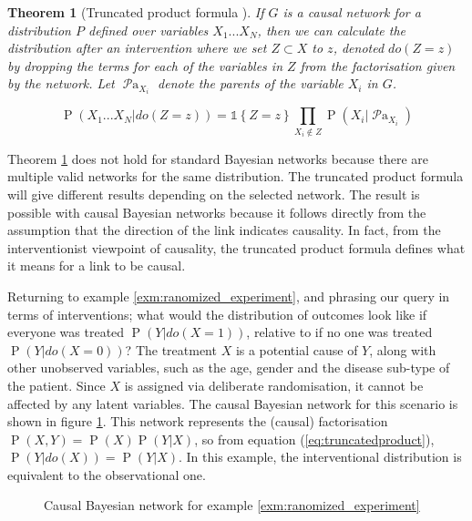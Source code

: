 \documentclass[11pt,a4paper,twoside]{report}
\newcommand{\set}[1]{\left\{#1\right\}}
\newcommand{\ind}[1]{\mathds{1}\!\!\set{#1}}
\renewcommand{\P}[1]{\operatorname{P}\left(#1\right)}
\newcommand{\parents}[1]{\operatorname{\mathcal{P}a}_{#1}}
\theoremstyle{plain}
\newtheorem{theorem}{Theorem}
\theoremstyle{definition}
\begin{document}
\vspace{0.5cm}
\begin{theorem}[Truncated product formula \citep{Pearl2000}]
\label{thm:truncated_prodcut}
If $G$ is a causal network for a distribution $P$ defined over variables $X_{1}...X_{N}$, then we can calculate the distribution after an intervention where we set $Z \subset X$ to $z$, denoted $do(Z=z)$ by dropping the terms for each of the variables in $Z$ from the factorisation given by the network. Let $\parents{X_i}$ denote the parents of the variable $X_i$ in $G$.

\begin{equation}
\label{eq:truncatedproduct}
\P{X_1...X_N|do(Z=z)} = \ind{Z = z}
  \prod_{X_i \notin Z}\P{X_{i}|\parents{X_i}}
\end{equation}
\end{theorem}


Theorem \ref{thm:truncated_prodcut} does not hold for standard Bayesian networks because there are multiple valid networks for the same distribution. The truncated product formula will give different results depending on the selected network. The result is possible with causal Bayesian networks because it follows directly from the assumption that the direction of the link indicates causality. In fact, from the interventionist viewpoint of causality, the truncated product formula defines what it means for a link to be causal. 


Returning to example \ref{exm:ranomized_experiment}, and phrasing our query in terms of interventions; what would the distribution of outcomes look like if everyone was treated $\P{Y|do(X=1)}$, relative to if no one was treated $\P{Y|do(X=0)}$? The treatment $X$ is a potential cause of $Y$, along with other unobserved variables, such as the age, gender and the disease sub-type of the patient. Since $X$ is assigned via deliberate randomisation, it cannot be affected by any latent variables. The causal Bayesian network for this scenario is shown in figure \ref{fig:causal_network_example}. This network represents the (causal) factorisation  $\P{X,Y} = \P{X}\P{Y|X}$, so from equation (\ref{eq:truncatedproduct}), $\P{Y|do(X)} = \P{Y|X}$. In this example, the interventional distribution is equivalent to the observational one.

\begin{figure}[ht]
\centering
{}
\caption{Causal Bayesian network for example \ref{exm:ranomized_experiment}}
\label{fig:causal_network_example}
\end{figure}
\end{document}
